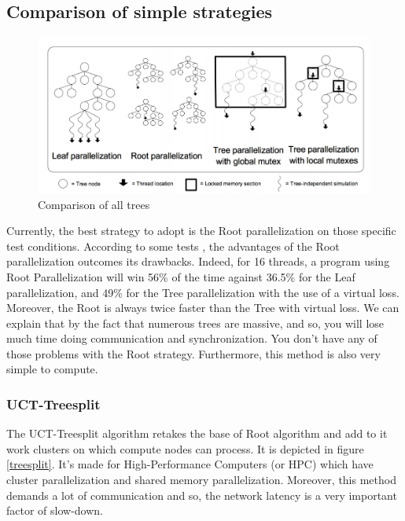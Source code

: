 \subsection{Comparison of simple strategies}
\begin{figure}[!h] 
\centerline{\includegraphics[scale=0.60]{2_State_of_the_art/Strategy_of_root_parallelization_Mikail/impara.png}}
   \caption{\label{étiquette} Comparison of all trees}
\label{comp_algo}
\end{figure}

Currently, the best strategy to adopt is the Root parallelization on those specific test conditions. According to some tests \cite{parallel_comp,tree_root_comp}, the advantages of the Root parallelization outcomes its drawbacks. Indeed, for 16 threads, a program using Root Parallelization will win 56\% of the time against 36.5\% for the Leaf parallelization, and 49\% for the Tree parallelization with the use of a virtual loss. Moreover, the Root is always twice faster than the Tree with virtual loss. We can explain that by the fact that numerous trees are massive, and so, you will lose much time doing communication and synchronization. You don’t have any of those problems with the Root strategy. Furthermore, this method is also very simple to compute.

\subsubsection{UCT-Treesplit}

The UCT-Treesplit algorithm\cite{treesplit} retakes the base of Root algorithm and add to it work clusters on which compute nodes can process. It is depicted in figure \ref{treesplit}. It’s made for High-Performance Computers (or HPC) which have cluster parallelization and shared memory parallelization. Moreover, this method demands a lot of communication and so, the network latency is a very important factor of slow-down.

